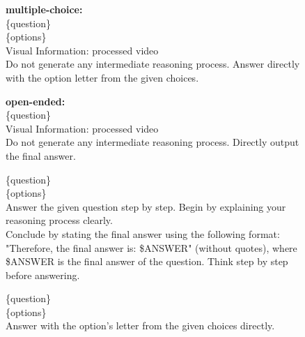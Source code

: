 \documentclass{llmxive}
\begin{document}
\begin{figure}[h]
\begin{tcolorbox}[colback=black!7.5!white, colframe=black!80!white, title=MMVU -- For other models, fontupper=\footnotesize, fontlower=\footnotesize, fonttitle=\footnotesize]

\textbf{multiple-choice:}\\
\{question\}\\
\{options\}\\
Visual Information: processed video\\
Do not generate any intermediate reasoning process. Answer directly with the option letter from the given choices.

\tcblower
\textbf{open-ended:}\\
\{question\}\\
Visual Information: processed video\\
Do not generate any intermediate reasoning process. Directly output the final answer.

\end{tcolorbox}
\end{figure}


\begin{figure}[h]
\begin{tcolorbox}[colback=black!7.5!white, colframe=black!80!white, title={SciVideoBench -- For Qwen series thinking models, GPT-5.4, Gemini 3 Pro, Claude Opus 4.5 and InternVL3.5-8B}, fontupper=\footnotesize, fontlower=\footnotesize, fonttitle=\footnotesize]
\{question\}\\
\{options\}\\
Answer the given question step by step. Begin by explaining your reasoning process
clearly.\\
Conclude by stating the final answer using the following format: "Therefore, the final answer is: \$ANSWER" (without quotes), where \$ANSWER is the final answer of the question. Think step by step before answering.
\end{tcolorbox}
\end{figure}

\begin{figure}[h]
\begin{tcolorbox}[colback=black!7.5!white, colframe=black!80!white, title={SciVideoBench -- For Qwen series instruct models and other models}, fontupper=\footnotesize, fontlower=\footnotesize, fonttitle=\footnotesize]
\{question\}\\
\{options\}\\
Answer with the option's letter from the given choices directly.
\end{tcolorbox}
\end{figure}
\end{document}
